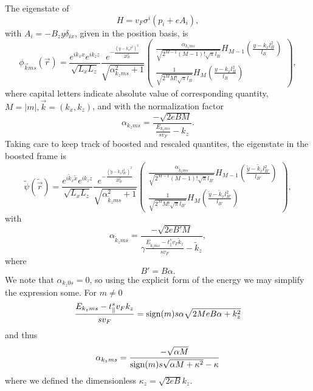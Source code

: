The eigenstate of
\[
H = v_{F} \sigma ^{i} ( p_{i} + e A_{i} ),
\]
with \(A_{i} = - B_{z} y \delta _{i x}\), given in the position basis, is
\begin{equation}
  \phi _{\vec{k} m s}(\vec{r}) =  \frac{e^{ik_x x}e^{ik_z z}}{\sqrt{L_xL_z}}
  \frac{e^{-\frac{(y-k_x l^2)^2}{2 l_B^2}}}{\sqrt{\alpha_{k_z m s}^2 + 1}}
  \begin{pmatrix}
    \frac{\alpha_{k_z m s}}{\sqrt{2^{M-1} (M-1)! \sqrt{\pi } l_B}} H_{M-1}\left( \frac{y-k_x l_B^2}{l_B} \right)\\
    \frac{1}{\sqrt{2^M M! \sqrt{\pi } l_B}} H_M \left( \frac{y-k_x l_B^2}{l_B} \right)
  \end{pmatrix},
\end{equation}
where capital letters indicate absolute value of corresponding quantity, $M=|m|, \vec{k} = (k_x, k_z)$, and with the normalization factor
\begin{equation}
  \alpha_{k_z m s} = \frac{-\sqrt{2eB M}}{\frac{E_{k_z m s}}{s v_{F}} -   k_z}.
\end{equation}
Taking care to keep track of boosted and rescaled quantites, the eigenstate in the boosted frame is
\begin{equation}
  \label{eq:47}
  \tilde{\psi}(\tilde{\vec{r}}) =
  \frac{e^{i \tilde{k}_x \tilde{x}}e^{i k_z z}}{\sqrt{L_xL_z}}
  \frac{e^{-\frac{\left(\tilde{y} - \tilde{k}_x l_{B'}^2\right)^2}{2 l_{B'}^2}}}{\sqrt{\alpha_{\tilde{k}_z m s}^2 + 1}}
  \begin{pmatrix}
    \frac{\alpha_{\tilde{k}_z m s}}{\sqrt{2^{M-1} (M-1)! \sqrt{\pi } l_{B'}}} H_{M-1}\left( \frac{\tilde{y} - \tilde{k}_x l_{B'}^2}{l_{B'}} \right)\\
    \frac{1}{\sqrt{2^M M! \sqrt{\pi } l_{B'}}} H_M \left( \frac{\tilde{y} - \tilde{k}_x l_{B'}^2}{l_{B'}} \right)
  \end{pmatrix},
\end{equation}
with
\begin{equation}
  \alpha_{\tilde{k}_z m s} = \frac{-\sqrt{2e B'  M}}{ \gamma \frac{E_{\tilde{k}_z m s} - t^s_{\parallel} v_{F} \tilde{k}_{z}}{s v_{F}} -   \tilde{k}_z},
\end{equation}
where
\[
B' = B \alpha.
\]
We note that \( \alpha_{k_z 0 s} = 0 \), so using the explicit form of the energy we may simplify the expression some.
For \( m\neq 0 \)
\[
  \frac{
    E_{k_z m s} - t^s_{\parallel} v_F k_z
  }{s v_{F}} = \operatorname{sign}(m) s \alpha \sqrt{2 M e B \alpha + k_{z}^2}
\]
and thus
\begin{equation}
  \label{eq:48}
  \alpha_{k_z m s} =
  \frac{-\sqrt{ \alpha M }}{\operatorname{sign}(m) s \sqrt{\alpha M + \kappa^2} - \kappa}
\end{equation}
where we defined the dimensionless \( \kappa_z = \sqrt{2 e B} k_z  \).

